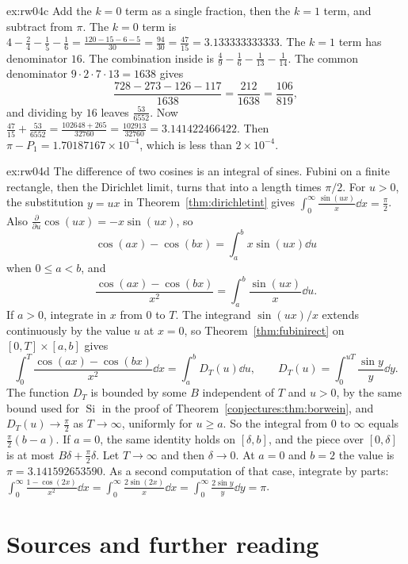 \begin{solution}{ex:rw04c}
\idea Add the $k=0$ term as a single fraction, then the $k=1$ term, and subtract from $\pi$.
\writeup The $k=0$ term is $4-\frac24-\frac15-\frac16=\frac{120-15-6-5}{30}=\frac{94}{30}=\frac{47}{15}=3.133333333333$. The $k=1$ term has denominator $16$. The combination inside is $\frac49-\frac16-\frac1{13}-\frac1{14}$. The common denominator $9\cdot2\cdot7\cdot13=1638$ gives
\[
\frac{728-273-126-117}{1638}=\frac{212}{1638}=\frac{106}{819},
\]
and dividing by $16$ leaves $\frac{53}{6552}$. Now $\frac{47}{15}+\frac{53}{6552}=\frac{102648+265}{32760}=\frac{102913}{32760}=3.141422466422$. Then $\pi-P_1=1.70187167\times10^{-4}$, which is less than $2\times10^{-4}$.
\end{solution}

\begin{solution}{ex:rw04d}
\idea The difference of two cosines is an integral of sines. Fubini on a finite rectangle, then the Dirichlet limit, turns that into a length times $\pi/2$.
\writeup For $u>0$, the substitution $y=ux$ in Theorem~\ref{thm:dirichletint} gives $\int_0^\infty\frac{\sin(ux)}x\dd x=\frac\pi2$. Also $\frac{\partial}{\partial u}\cos(ux)=-x\sin(ux)$, so
\[
\cos(ax)-\cos(bx)=\int_a^b x\sin(ux)\dd u
\]
when $0\le a<b$, and
\[
\frac{\cos(ax)-\cos(bx)}{x^2}=\int_a^b\frac{\sin(ux)}x\dd u.
\]
If $a>0$, integrate in $x$ from $0$ to $T$. The integrand $\sin(ux)/x$ extends continuously by the value $u$ at $x=0$, so Theorem~\ref{thm:fubinirect} on $[0,T]\times[a,b]$ gives
\[
\int_0^T\frac{\cos(ax)-\cos(bx)}{x^2}\dd x=\int_a^b D_T(u)\dd u,\qquad D_T(u)=\int_0^{uT}\frac{\sin y}y\dd y.
\]
The function $D_T$ is bounded by some $B$ independent of $T$ and $u>0$, by the same bound used for $\operatorname{Si}$ in the proof of Theorem~\ref{conjectures:thm:borwein}, and $D_T(u)\to\frac\pi2$ as $T\to\infty$, uniformly for $u\ge a$. So the integral from $0$ to $\infty$ equals $\frac\pi2(b-a)$. If $a=0$, the same identity holds on $[\delta,b]$, and the piece over $[0,\delta]$ is at most $B\delta+\frac\pi2\delta$. Let $T\to\infty$ and then $\delta\to0$. At $a=0$ and $b=2$ the value is $\pi=3.141592653590$. As a second computation of that case, integrate by parts: $\int_0^\infty\frac{1-\cos(2x)}{x^2}\dd x=\int_0^\infty\frac{2\sin(2x)}x\dd x=\int_0^\infty\frac{2\sin y}y\dd y=\pi$.
\end{solution}

\section*{Sources and further reading}

